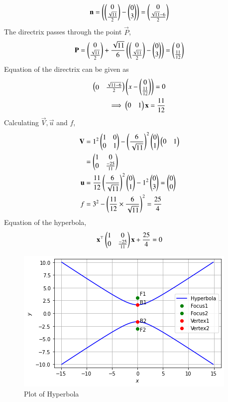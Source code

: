 \documentclass[journal,12pt,twocolumn]{IEEEtran}
\begin{document}
\begin{align}
    \mathbf{n} = \left(\begin{pmatrix}0\\\frac{\sqrt{11}}{2}\end{pmatrix}-\begin{pmatrix}0\\3\end{pmatrix}\right) =  \begin{pmatrix}0\\\frac{\sqrt{11}-6}{2}\end{pmatrix}
\end{align}
The directrix passes through the point $\vec{P}$,
\begin{align}
    \mathbf{P} = \begin{pmatrix}0\\\frac{\sqrt{11}}{2}\end{pmatrix} +\frac{\sqrt{11}}{6}\left(\begin{pmatrix}0\\\frac{\sqrt{11}}{2}\end{pmatrix}-\begin{pmatrix}0\\3\end{pmatrix}\right)= \begin{pmatrix}0\\\frac{11}{12}\end{pmatrix}
\end{align}
Equation of the directrix can be given as
\begin{align}
    \begin{pmatrix}0&\frac{\sqrt{11-6}}{2}\end{pmatrix}\left(x - \begin{pmatrix}0\\\frac{11}{12}\end{pmatrix}\right) = 0\\
    \implies \begin{pmatrix}0&1\end{pmatrix}\mathbf{x} = \frac{11}{12}
\end{align}
Calculating $\vec{V}, \vec{u}$ and $f$,
\begin{align}
    \mathbf{V} &= 1^2\begin{pmatrix}1&0\\0&1\end{pmatrix} - \left(\frac{6}{\sqrt{11}}\right)^2\begin{pmatrix}0\\1\end{pmatrix}\begin{pmatrix}0&1\end{pmatrix}\\
    &= \begin{pmatrix}1&0\\0&\frac{-25}{11}\end{pmatrix}\\
     \mathbf{u} &= \frac{11}{12}\left(\frac{6}{\sqrt{11}}\right)^2\begin{pmatrix}0\\1\end{pmatrix} - 1^2\begin{pmatrix}0\\3\end{pmatrix}=\begin{pmatrix}0\\0\end{pmatrix}\\
    f &= 3^2 - \left(\frac{11}{12}\times\frac{6}{\sqrt{11}}\right)^2 = \frac{25}{4}
\end{align}
Equation of the hyperbola,
\begin{align}
    \mathbf{x}^{\top}\begin{pmatrix}1&0\\0&\frac{-25}{11}\end{pmatrix}\mathbf{x}+\frac{25}{4}=0
\end{align}
\begin{figure}[h!]
\centering
\includegraphics[width=\columnwidth]{hyperbola_plot.png}
\caption{Plot of Hyperbola}
\label{fig:hyperbola}
\end{figure}
\end{document}
